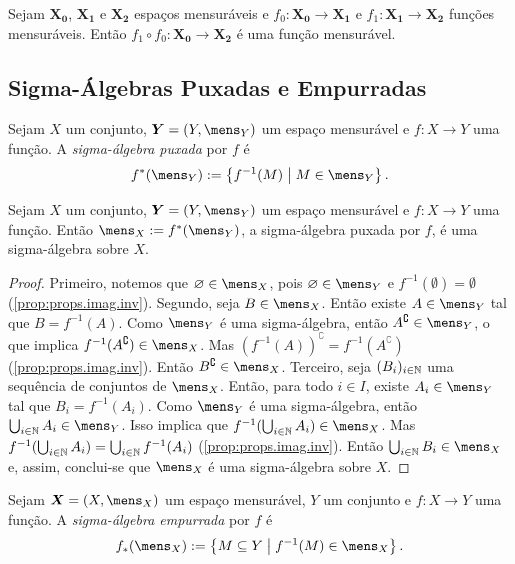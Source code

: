 \begin{prop}
Sejam $\bm{X_0}$, $\bm{X_1}$ e $\bm{X_2}$ espaços mensuráveis e $f_0: \bm{X_0} \to \bm{X_1}$ e $f_1: \bm{X_1} \to \bm{X_2}$ funções mensuráveis. Então $f_1 \circ f_0: \bm{X_0} \to \bm{X_2}$ é uma função mensurável.
\end{prop}

\subsection{Sigma-Álgebras Puxadas e Empurradas}

\begin{defi}
Sejam $X$ um conjunto, $\bm Y = (Y,\mens_Y)$ um espaço mensurável e $f: X \to Y$ uma função. A \emph{sigma-álgebra puxada} por $f$ é
	\begin{equation*}
	f^*(\mens_Y) := \set{f^{-1}(M)}{M \in \mens_Y}.
	\end{equation*}
\end{defi}

\begin{prop}
Sejam $X$ um conjunto, $\bm Y = (Y,\mens_Y)$ um espaço mensurável e $f: X \to Y$ uma função. Então $\mens_X := f^*(\mens_Y)$, a sigma-álgebra puxada por $f$, é uma sigma-álgebra sobre $X$.
\end{prop}
\begin{proof}
Primeiro, notemos que $\emptyset \in \mens_X$, pois $\emptyset \in \mens_Y$ e $f^{-1}(\emptyset) = \emptyset$ (\ref{prop:props.imag.inv}). Segundo, seja $B \in \mens_X$. Então existe $A \in \mens_Y$ tal que $B = f^{-1}(A)$. Como $\mens_Y$ é uma sigma-álgebra, então $A^\complement \in \mens_Y$, o que implica $f^{-1}(A^\complement) \in \mens_X$. Mas $(f^{-1}(A))^\complement = f^{-1}(A^\complement)$ (\ref{prop:props.imag.inv}). Então $B^\complement \in \mens_X$. Terceiro, seja $(B_i)_{i \in \mathbb{N}}$ uma sequência de conjuntos de $\mens_X$. Então, para todo $i \in I$, existe $A_i \in \mens_Y$ tal que $B_i = f^{-1}(A_i)$. Como $\mens_Y$ é uma sigma-álgebra, então $\bigcup_{i \in \N} A_i \in \mens_Y$. Isso implica que $f^{-1}(\bigcup_{i \in \N} A_i) \in \mens_X$. Mas $f^{-1}(\bigcup_{i \in \mathbb{N}} A_i) = \bigcup_{i \in \mathbb{N}} f^{-1}(A_i)$ (\ref{prop:props.imag.inv}). Então $\bigcup_{i \in \N} B_i \in \mens_X$ e, assim, conclui-se que $\mens_X$ é uma sigma-álgebra sobre $X$.
\end{proof}

\begin{defi}
Sejam $\bm X = (X,\mens_X)$ um espaço mensurável, $Y$ um conjunto e $f: X \to Y$ uma função. A \emph{sigma-álgebra empurrada} por $f$ é
	\begin{equation*}
	f_*(\mens_X) := \set{M \subseteq Y}{f^{-1}(M) \in \mens_X}.
	\end{equation*}
\end{defi}

